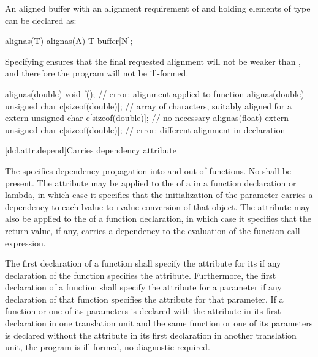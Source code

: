 \pnum
\begin{example}
An aligned buffer with an alignment requirement
of  and holding  elements of type 
can be declared as:
\begin{codeblock}
alignas(T) alignas(A) T buffer[N];
\end{codeblock}
Specifying  ensures
that the final requested alignment will not be weaker than ,
and therefore the program will not be ill-formed.
\end{example}

\pnum
\begin{example}
\begin{codeblock}
alignas(double) void f();                           // error: alignment applied to function
alignas(double) unsigned char c[sizeof(double)];    // array of characters, suitably aligned for a 
extern unsigned char c[sizeof(double)];             // no  necessary
alignas(float)
  extern unsigned char c[sizeof(double)];           // error: different alignment in declaration
\end{codeblock}
\end{example}

[dcl.attr.depend]{Carries dependency attribute}%

\pnum
The   specifies
dependency propagation into and out of functions.
No
 shall be present. The attribute may be
applied to the  of a
 in a function declaration or lambda, in
which case it specifies that the initialization of the parameter carries a
dependency to each lvalue-to-rvalue
conversion of that object. The attribute may also be applied
to the  of a function declaration, in which case it
specifies that the return value, if any, carries a dependency to the evaluation
of the function call expression.

\pnum
The first declaration of a function shall specify the  attribute for its
 if any declaration of the function specifies the
 attribute. Furthermore, the first declaration of a function shall specify
the  attribute for a parameter if any declaration of that function
specifies the  attribute for that parameter. If a function or one of its
parameters is declared with the  attribute in its first declaration in one
translation unit and the same function or one of its parameters is declared without the
 attribute in its first declaration in another translation unit, the
program is ill-formed, no diagnostic required.

